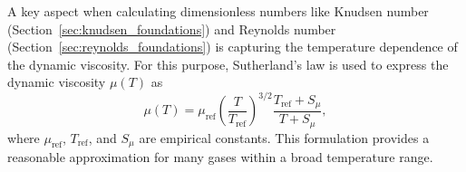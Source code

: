 A key aspect when calculating dimensionless numbers like Knudsen number (Section~\ref{sec:knudsen_foundations}) and Reynolds number (Section~\ref{sec:reynolds_foundations}) is capturing the temperature dependence of the dynamic viscosity.
For this purpose, Sutherland's law is used to express the dynamic viscosity $\mu(T)$ as 
\begin{equation}
  \mu(T)
  = \mu_{\text{ref}}
    \left(\frac{T}{T_{\text{ref}}}\right)^{3/2}
    \frac{T_{\text{ref}} + S_\mu}{T + S_\mu},
	\label{eq:sutherland}
\end{equation}
where $\mu_{\text{ref}}$, $T_{\text{ref}}$, and $S_\mu$ are empirical constants.
This formulation provides a reasonable approximation for many gases within a broad temperature range.

